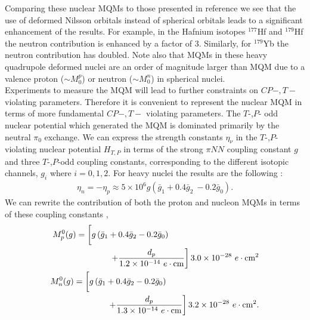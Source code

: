 \documentclass[10pt,a4paper, twoside, openright]{report}
\begin{document}
Comparing these nuclear MQMs to those presented in reference \cite{Flambaum2014} we see that the use of  deformed Nilsson orbitals instead of spherical orbitals leads to a  significant enhancement of the results. For example, in the Hafnium isotopes $^{177}$Hf and  $^{179}$Hf the neutron contribution is enhanced by a factor of 3.  Similarly, for $^{179}$Yb the neutron contribution has doubled.  Note also that  MQMs in these heavy quadrupole deformed nuclei are an order of magnitude larger than MQM due to a valence proton   ($ \sim M_{0}^{p}$)  or neutron  ($\sim M_{0}^{n}$) in spherical nuclei.\\
\linebreak
Experiments to measure the MQM will lead to further constraints on $CP-,T-$ violating parameters. Therefore it is convenient to represent the nuclear MQM in terms of more fundamental $CP-,T-$ violating parameters. The $T$-,$P$- odd nuclear potential which generated the MQM is dominated primarily by the neutral $\pi_0$ exchange. We can express the strength constants $\eta_{\nu}$ in the  $T$-,$P$- violating nuclear potential $H_{T,P}$  in terms of the strong $\pi NN$ coupling constant $g$ and three $T$-,$P$-odd coupling constants, corresponding to the different isotopic  channels,  $g_i$ where $i=0,1,2$. For heavy nuclei the results are the following  \cite{Dmitriev1994, SFK1984}:
\begin{align}
\eta_{n} = -\eta_{p} \approx 5\times 10^{6}g\left(\bar{g}_1 + 0.4 \bar{g}_2\ - 0.2\bar{g}_0\right) .
\end{align}
We can rewrite the contribution of both the proton and nucleon MQMs in terms of these coupling constants \cite{Flambaum1994, Vorov1995},
\begin{align} 
\begin{split}
M_{p}^0(g) &= \left[ \vphantom{\dfrac{1}{2}} g\left(\bar{g}_1 + 0.4\bar{g}_2 - 0.2\bar{g}_0\right) \right. \\
&\qquad \qquad \left. + \dfrac{d_{p}}{1.2 \times 10^{-14} \ e\cdot\text{cm}}\right]3.0 \times 10^{-28} \ e\cdot\text{cm}^2 
\end{split}\label{eq:MQM_pion_p} \\
\begin{split}
M_{n}^0(g) &= \left[ \vphantom{\dfrac{1}{2}} g\left(\bar{g}_1 + 0.4\bar{g}_2 - 0.2\bar{g}_0\right) \right. \\
& \qquad \qquad  \left. + \dfrac{d_{p}}{1.3 \times 10^{-14} \ e\cdot\text{cm}}\right]3.2 \times 10^{-28} \ e\cdot\text{cm}^2. 
\end{split} \label{eq:MQM_pion_n}
\end{align}
\end{document}

